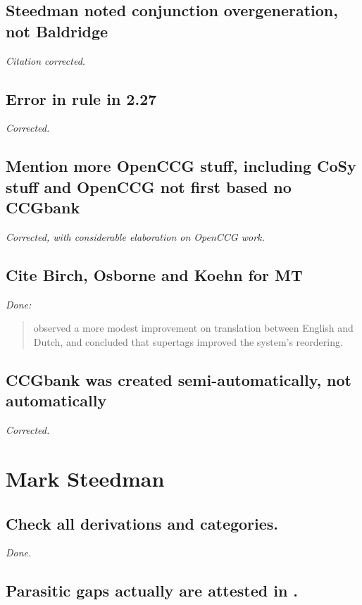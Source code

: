 \subsection{Steedman noted conjunction overgeneration, not Baldridge}

\emph{Citation corrected.}

\subsection{Error in rule in 2.27}

\emph{Corrected.}

\subsection{Mention more OpenCCG stuff, including CoSy stuff and OpenCCG not
first based no CCGbank}

\emph{Corrected, with considerable elaboration on OpenCCG work.}

\subsection{Cite Birch, Osborne and Koehn for MT}

\emph{Done:}

\begin{quote}
\citet{birch:07} observed a more modest improvement on translation between
English and Dutch, and concluded that supertags improved the system's
reordering. 
\end{quote}


\subsection{CCGbank was created semi-automatically, not automatically}

\emph{Corrected.}

\section{Mark Steedman}

\subsection{Check all derivations and categories.}

\emph{Done.}

\subsection{Parasitic gaps actually are attested in \ccgbank.}

